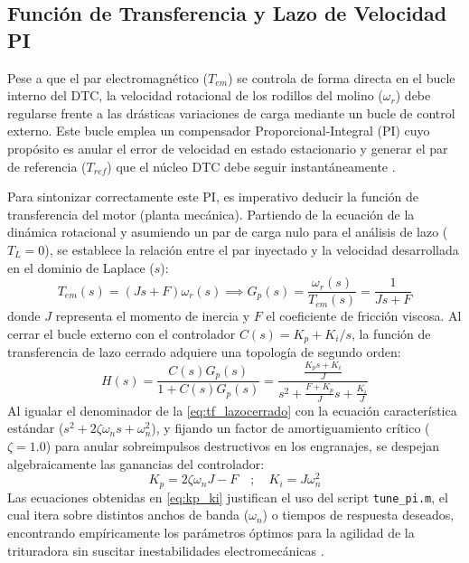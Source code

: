 \documentclass[conference]{IEEEtran}
\begin{document}
\subsection{Función de Transferencia y Lazo de Velocidad PI}
Pese a que el par electromagnético ($T_{em}$) se controla de forma directa en el bucle interno del DTC, la velocidad rotacional de los rodillos del molino ($\omega_r$) debe regularse frente a las drásticas variaciones de carga mediante un bucle de control externo. Este bucle emplea un compensador Proporcional-Integral (PI) cuyo propósito es anular el error de velocidad en estado estacionario y generar el par de referencia ($T_{ref}$) que el núcleo DTC debe seguir instantáneamente \cite{ong1998}.

Para sintonizar correctamente este PI, es imperativo deducir la función de transferencia del motor (planta mecánica). Partiendo de la ecuación de la dinámica rotacional y asumiendo un par de carga nulo para el análisis de lazo ($T_L = 0$), se establece la relación entre el par inyectado y la velocidad desarrollada en el dominio de Laplace ($s$):
\begin{equation}
    T_{em}(s) = (J s + F) \omega_r(s) \implies G_p(s) = \frac{\omega_r(s)}{T_{em}(s)} = \frac{1}{J s + F}
    \label{eq:tf_planta}
\end{equation}
donde $J$ representa el momento de inercia y $F$ el coeficiente de fricción viscosa. Al cerrar el bucle externo con el controlador $C(s) = K_p + K_i/s$, la función de transferencia de lazo cerrado adquiere una topología de segundo orden:
\begin{equation}
    H(s) = \frac{C(s) G_p(s)}{1 + C(s) G_p(s)} = \frac{\frac{K_p s + K_i}{J}}{s^2 + \frac{F + K_p}{J} s + \frac{K_i}{J}}
    \label{eq:tf_lazocerrado}
\end{equation}
Al igualar el denominador de la \autoref{eq:tf_lazocerrado} con la ecuación característica estándar ($s^2 + 2\zeta\omega_n s + \omega_n^2$), y fijando un factor de amortiguamiento crítico ($\zeta = 1.0$) para anular sobreimpulsos destructivos en los engranajes, se despejan algebraicamente las ganancias del controlador:
\begin{equation}
    K_p = 2\zeta\omega_n J - F \quad ; \quad K_i = J \omega_n^2
    \label{eq:kp_ki}
\end{equation}
Las ecuaciones obtenidas en \autoref{eq:kp_ki} justifican el uso del script \texttt{tune\_pi.m}, el cual itera sobre distintos anchos de banda ($\omega_n$) o tiempos de respuesta deseados, encontrando empíricamente los parámetros óptimos para la agilidad de la trituradora sin suscitar inestabilidades electromecánicas \cite{krishnan2001}.
\end{document}

